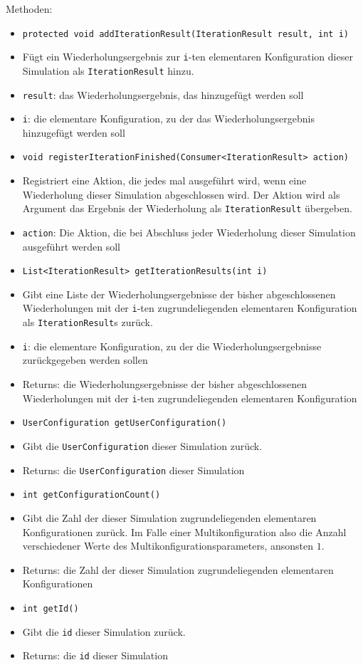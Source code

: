 \documentclass[parskip=full,11pt]{scrartcl}
\begin{document}
Methoden:
\begin{itemize}\itemsep -10pt
\item \texttt{protected void addIterationResult(IterationResult result, int i)}
\item[] Fügt ein Wiederholungsergebnis zur \texttt{i}-ten elementaren Konfiguration dieser Simulation als \texttt{IterationResult} hinzu.
\item[] \texttt{result}: das Wiederholungsergebnis, das hinzugefügt werden soll
\item[] \texttt{i}: die elementare Konfiguration, zu der das Wiederholungsergebnis hinzugefügt werden soll

\item \texttt{void registerIterationFinished(Consumer<IterationResult> action)}
\item[] Registriert eine Aktion, die jedes mal ausgeführt wird, wenn eine Wiederholung dieser Simulation abgeschlossen wird. Der Aktion wird als Argument das Ergebnis der Wiederholung als \texttt{IterationResult} übergeben.
\item[] \texttt{action}: Die Aktion, die bei Abschluss jeder Wiederholung dieser Simulation ausgeführt werden soll

\item \texttt{List<IterationResult> getIterationResults(int i)}
\item[] Gibt eine Liste der Wiederholungsergebnisse der bisher abgeschlossenen Wiederholungen mit der \texttt{i}-ten zugrundeliegenden elementaren Konfiguration als \texttt{IterationResult}s zurück.
\item[] \texttt{i}: die elementare Konfiguration, zu der die Wiederholungsergebnisse zurückgegeben werden sollen
\item[] Returns: die Wiederholungsergebnisse der bisher abgeschlossenen Wiederholungen mit der \texttt{i}-ten zugrundeliegenden elementaren Konfiguration

\item \texttt{UserConfiguration getUserConfiguration()}
\item[] Gibt die \texttt{UserConfiguration} dieser Simulation zurück.
\item[] Returns: die \texttt{UserConfiguration} dieser Simulation

\item \texttt{int getConfigurationCount()}
\item[] Gibt die Zahl der dieser Simulation zugrundeliegenden elementaren Konfigurationen zurück. Im Falle einer Multikonfiguration also die Anzahl verschiedener Werte des Multikonfigurationsparameters, ansonsten \(1\).
\item[] Returns: die Zahl der dieser Simulation zugrundeliegenden elementaren Konfigurationen

\item \texttt{int getId()}
\item[] Gibt die \texttt{id} dieser Simulation zurück.
\item[] Returns: die \texttt{id} dieser Simulation
\end{itemize}
\end{document}
